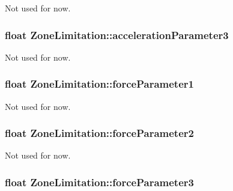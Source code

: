 Not used for now. 

\subsubsection[{\texorpdfstring{acceleration\+Parameter3}{accelerationParameter3}}]{\setlength{\rightskip}{0pt plus 5cm}float Zone\+Limitation\+::acceleration\+Parameter3}\hypertarget{struct_zone_limitation_acd79cd4be6eec8b839f58c65b32a63d3}{}\label{struct_zone_limitation_acd79cd4be6eec8b839f58c65b32a63d3}


Not used for now. 

\subsubsection[{\texorpdfstring{force\+Parameter1}{forceParameter1}}]{\setlength{\rightskip}{0pt plus 5cm}float Zone\+Limitation\+::force\+Parameter1}\hypertarget{struct_zone_limitation_aba463cd66d41b3ada5a702a9e1179ee4}{}\label{struct_zone_limitation_aba463cd66d41b3ada5a702a9e1179ee4}


Not used for now. 

\subsubsection[{\texorpdfstring{force\+Parameter2}{forceParameter2}}]{\setlength{\rightskip}{0pt plus 5cm}float Zone\+Limitation\+::force\+Parameter2}\hypertarget{struct_zone_limitation_aecd1956a2eae32a16b7e0c28e6191e1b}{}\label{struct_zone_limitation_aecd1956a2eae32a16b7e0c28e6191e1b}


Not used for now. 

\subsubsection[{\texorpdfstring{force\+Parameter3}{forceParameter3}}]{\setlength{\rightskip}{0pt plus 5cm}float Zone\+Limitation\+::force\+Parameter3}\hypertarget{struct_zone_limitation_a00785b40bfee162c2c86692c5882c9d6}{}\label{struct_zone_limitation_a00785b40bfee162c2c86692c5882c9d6}


